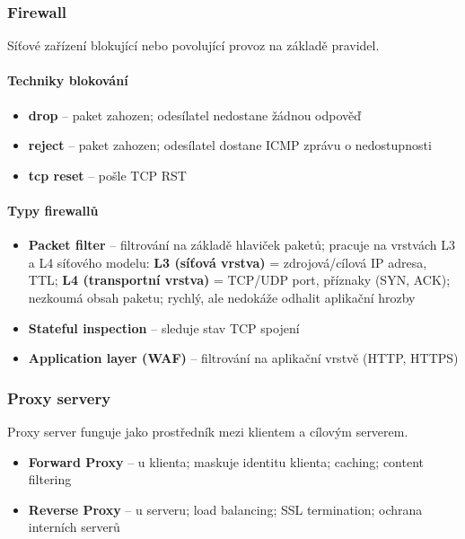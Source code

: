 \subsubsection{Firewall}

Síťové zařízení blokující nebo povolující provoz na základě pravidel.

\paragraph{Techniky blokování}
\begin{itemize}
  \item \textbf{drop} -- paket zahozen; odesílatel nedostane žádnou odpověď
  \item \textbf{reject} -- paket zahozen; odesílatel dostane ICMP zprávu o nedostupnosti
  \item \textbf{tcp reset} -- pošle TCP RST
\end{itemize}

\paragraph{Typy firewallů}
\begin{itemize}
  \item \textbf{Packet filter} -- filtrování na základě hlaviček paketů; pracuje na vrstvách L3 a L4 síťového modelu:
    \textbf{L3 (síťová vrstva)} = zdrojová/cílová IP adresa, TTL;
    \textbf{L4 (transportní vrstva)} = TCP/UDP port, příznaky (SYN, ACK); nezkoumá obsah paketu; rychlý, ale nedokáže odhalit aplikační hrozby
  \item \textbf{Stateful inspection} -- sleduje stav TCP spojení
  \item \textbf{Application layer (WAF)} -- filtrování na aplikační vrstvě (HTTP, HTTPS)
\end{itemize}

\subsubsection{Proxy servery}

Proxy server funguje jako prostředník mezi klientem a cílovým serverem.
\begin{itemize}
  \item \textbf{Forward Proxy} -- u klienta; maskuje identitu klienta; caching; content filtering
  \item \textbf{Reverse Proxy} -- u serveru; load balancing; SSL termination; ochrana interních serverů
\end{itemize}

